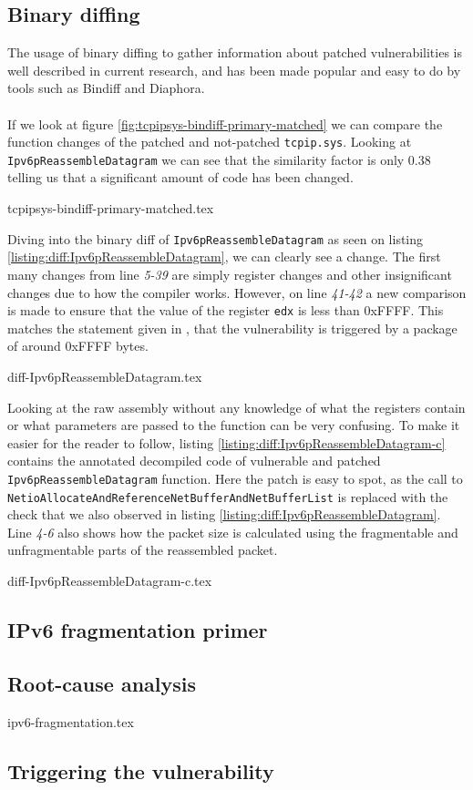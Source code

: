 \documentclass{report}
\begin{document}
\subsection{Binary diffing}
The usage of binary diffing to gather information about patched vulnerabilities is well described in current research\cite{url:binary-diffing:1}\cite{url:binary-diffing:2}, and has been made popular and easy to do by tools such as Bindiff\cite{url:bindiff:homepage} and Diaphora\cite{url:diaphora:homepage}. 
\\
\\
If we look at figure \ref{fig:tcpipsys-bindiff-primary-matched} we can compare the function changes of the patched and not-patched \texttt{tcpip.sys}. Looking at \texttt{Ipv6pReassembleDatagram} we can see that the similarity factor is only 0.38 telling us that a significant amount of code has been changed.

{tcpipsys-bindiff-primary-matched.tex}

Diving into the binary diff of \texttt{Ipv6pReassembleDatagram} as seen on listing \ref{listing:diff:Ipv6pReassembleDatagram}, we can clearly see a change. The first many changes from line \emph{5-39} are simply register changes and other insignificant changes due to how the compiler works. However, on line \emph{41-42} a new comparison is made to ensure that the value of the register \texttt{edx} is less than 0xFFFF. This matches the statement given in , that the vulnerability is triggered by a package of around 0xFFFF bytes.

{diff-Ipv6pReassembleDatagram.tex}

Looking at the raw assembly without any knowledge of what the registers contain or what parameters are passed to the function can be very confusing. To make it easier for the reader to follow, listing \ref{listing:diff:Ipv6pReassembleDatagram-c} contains the annotated decompiled code of vulnerable and patched \texttt{Ipv6pReassembleDatagram} function. Here the patch is easy to spot, as the call to \texttt{NetioAllocateAndReferenceNetBufferAndNetBufferList} is replaced with the check that we also observed in listing \ref{listing:diff:Ipv6pReassembleDatagram}. Line \emph{4-6} also shows how the packet size is calculated using the fragmentable and unfragmentable parts of the reassembled packet.

{diff-Ipv6pReassembleDatagram-c.tex}

\subsection{IPv6 fragmentation primer}

\subsection{Root-cause analysis}

{ipv6-fragmentation.tex}
\subsection{Triggering the vulnerability}

\end{document}
